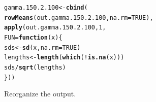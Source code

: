 \documentclass[11pt]{article}\usepackage[]{graphicx}\usepackage[]{color}
\makeatletter
\newcommand{\hlnum}[1]{\textcolor[rgb]{0.686,0.059,0.569}{#1}}%
\newcommand{\hlopt}[1]{\textcolor[rgb]{0,0,0}{#1}}%
\newcommand{\hlstd}[1]{\textcolor[rgb]{0.345,0.345,0.345}{#1}}%
\newcommand{\hlkwa}[1]{\textcolor[rgb]{0.161,0.373,0.58}{\textbf{#1}}}%
\newcommand{\hlkwb}[1]{\textcolor[rgb]{0.69,0.353,0.396}{#1}}%
\newcommand{\hlkwc}[1]{\textcolor[rgb]{0.333,0.667,0.333}{#1}}%
\newcommand{\hlkwd}[1]{\textcolor[rgb]{0.737,0.353,0.396}{\textbf{#1}}}%
\newenvironment{kframe}{%
 \def\at@end@of@kframe{}%
 \ifinner\ifhmode%
  \def\at@end@of@kframe{\end{minipage}}%
  \begin{minipage}{\columnwidth}%
 \fi\fi%
 \def\FrameCommand##1{\hskip\@totalleftmargin \hskip-\fboxsep
 \colorbox{shadecolor}{##1}\hskip-\fboxsep
     \hskip-\linewidth \hskip-\@totalleftmargin \hskip\columnwidth}%
 \MakeFramed {\advance\hsize-\width
   \@totalleftmargin\z@ \linewidth\hsize
   \@setminipage}}%
 {\par\unskip\endMakeFramed%
 \at@end@of@kframe}
\newenvironment{knitrout}{}{} %
\makeatother
\begin{document}
\begin{knitrout}
\color{fgcolor}\begin{kframe}
\begin{alltt}
\hlstd{gamma.150.2.100} \hlkwb{<-} \hlkwd{cbind}\hlstd{(}
  \hlkwd{rowMeans}\hlstd{(out.gamma.150.2.100,} \hlkwc{na.rm} \hlstd{=} \hlnum{TRUE}\hlstd{),}
  \hlkwd{apply}\hlstd{(out.gamma.150.2.100,} \hlnum{1}\hlstd{,}
  \hlkwc{FUN} \hlstd{=} \hlkwa{function}\hlstd{(}\hlkwc{x}\hlstd{)\{}
    \hlstd{sds} \hlkwb{<-} \hlkwd{sd}\hlstd{(x,} \hlkwc{na.rm} \hlstd{=} \hlnum{TRUE}\hlstd{)}
    \hlstd{lengths} \hlkwb{<-} \hlkwd{length}\hlstd{(}\hlkwd{which}\hlstd{(}\hlopt{!}\hlkwd{is.na}\hlstd{(x)))}
    \hlstd{sds} \hlopt{/} \hlkwd{sqrt}\hlstd{(lengths)}
  \hlstd{\}))}
\end{alltt}


{\ttfamily\noindent\bfseries\color{errorcolor}{\#\# Error in is.data.frame(x): object 'out.gamma.150.2.100' not found}}\end{kframe}
\end{knitrout}


Reorganize the output.
\end{document}
